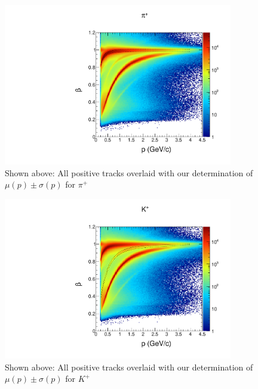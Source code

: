 \begin{figure}
  \begin{center}
    \includegraphics[width=10cm]{image/plots/hadron-id/beautiful_pbeta_pip.pdf}
    \caption{ Shown above: All positive tracks overlaid with our determination of $\mu(p) \pm \sigma(p)$ for $\pi^+$}
  \end{center}
\end{figure}

\begin{figure}
  \begin{center}
    \includegraphics[width=10cm]{image/plots/hadron-id/beautiful_pbeta_kp.pdf}
    \caption{ Shown above: All positive tracks overlaid with our determination of $\mu(p) \pm \sigma(p)$ for $K^+$}
  \end{center}
\end{figure}

